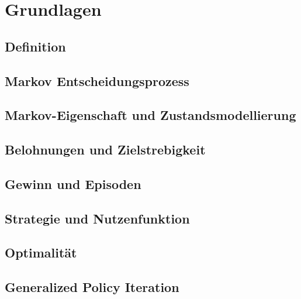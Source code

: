 \documentclass[12pt]{scrartcl}
\numberwithin{equation}{section}
\begin{document}

\pagebreak

\section{Grundlagen}\label{sec:Grundlagen}
	
	\subsection{Definition}\label{sec:definition}
	

	\subsection{Markov Entscheidungsprozess}\label{sec:MDP}
	

	\subsection{Markov-Eigenschaft und Zustandsmodellierung}\label{sec:MP}
	

	\subsection{Belohnungen und Zielstrebigkeit}\label{sec:belohnung}
	

	\subsection{Gewinn und Episoden}\label{sec:Gewinne}
	

	\subsection{Strategie und Nutzenfunktion}\label{sec:StrategieNutzenfunktion}
	

	\subsection{Optimalität} \label{sec:optimality}
	

	\subsection{Generalized Policy Iteration}\label{sec:GPI}
	
\end{document}
